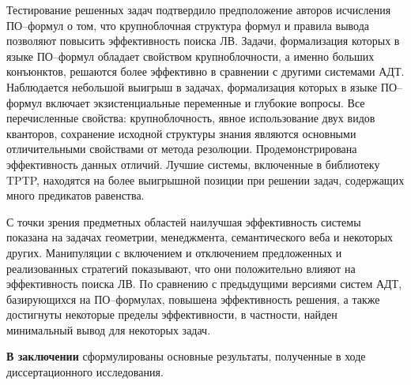 \documentclass[a4paper]{report}
\begin{document}
Тестирование решенных задач подтвердило предположение авторов исчисления ПО--формул о том, что крупноблочная структура формул и правила вывода позволяют повысить эффективность поиска ЛВ. Задачи, формализация которых в языке ПО--формул обладает свойством крупноблочности, а именно больших конъюнктов, решаются более эффективно в сравнении с другими системами АДТ. Наблюдается небольшой выигрыш в задачах, формализация которых в языке ПО--формул включает экзистенциальные переменные и глубокие вопросы. Все перечисленные свойства: крупноблочность, явное использование двух видов кванторов, сохранение исходной структуры знания являются основными отличительными свойствами от метода резолюции. Продемонстрирована эффективность данных отличий. Лучшие системы, включенные в библиотеку TPTP, находятся на более выигрышной позиции при решении задач, содержащих много предикатов равенства.

С точки зрения предметных областей наилучшая эффективность системы показана на задачах геометрии, менеджмента, семантического веба и некоторых других. Манипуляции с включением и отключением предложенных и реализованных стратегий показывают, что они положительно влияют на эффективность поиска ЛВ. По сравнению с предыдущими версиями систем АДТ, базирующихся на ПО--формулах, повышена эффективность решения, а также достигнуты некоторые пределы эффективности, в частности, найден минимальный вывод для некоторых задач.



\textbf{В заключении} сформулированы основные результаты, полученные в ходе диссертационного исследования.

\end{document}
